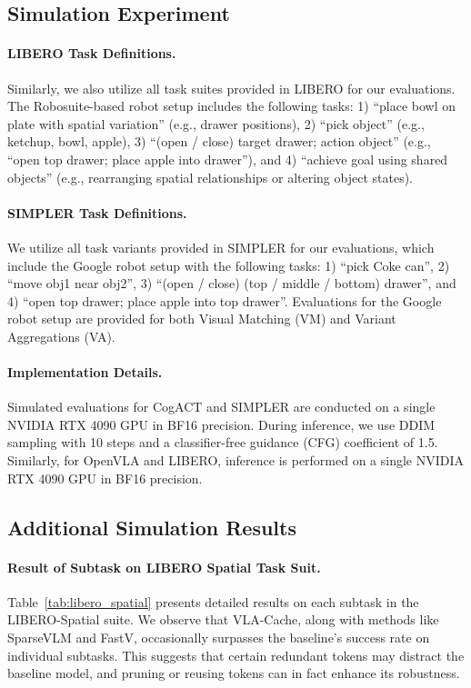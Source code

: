 \subsection{Simulation Experiment}

\paragraph{LIBERO Task Definitions.}
Similarly, we also utilize all task suites provided in LIBERO for our evaluations. The Robosuite-based robot setup includes the following tasks: 1) ``place bowl on plate with {spatial variation}'' (e.g., drawer positions), 2) ``pick {object}'' (e.g., ketchup, bowl, apple), 3) ``(open / close) {target} drawer; {action} {object}'' (e.g., ``open top drawer; place apple into drawer''), and 4) ``achieve {goal} using shared objects'' (e.g., rearranging spatial relationships or altering object states).

\paragraph{SIMPLER Task Definitions.}
We utilize all task variants provided in SIMPLER for our evaluations, which include the Google robot setup with the following tasks: 1) ``pick Coke can'', 2) ``move {obj1} near {obj2}'', 3) ``(open / close) (top / middle / bottom) drawer'', and 4) ``open top drawer; place apple into top drawer''. Evaluations for the Google robot setup are provided for both Visual Matching (VM) and Variant Aggregations (VA).

\paragraph{Implementation Details.} Simulated evaluations for CogACT and SIMPLER are conducted on a single NVIDIA RTX 4090 GPU in BF16 precision. During inference, we use DDIM sampling with 10 steps and a classifier-free guidance (CFG) coefficient of 1.5. Similarly, for OpenVLA and LIBERO, inference is performed on a single NVIDIA RTX 4090 GPU in BF16 precision.
\subsection{Additional Simulation Results}


\paragraph{Result of Subtask on LIBERO Spatial Task Suit.}
Table~\ref{tab:libero_spatial} presents detailed results on each subtask in the LIBERO-Spatial suite. We observe that VLA-Cache, along with methods like SparseVLM and FastV, occasionally surpasses the baseline’s success rate on individual subtasks. This suggests that certain redundant tokens may distract the baseline model, and pruning or reusing tokens can in fact enhance its robustness.


